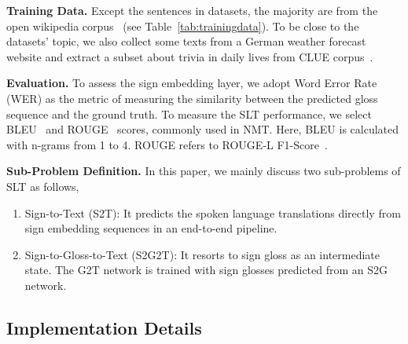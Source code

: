 \documentclass[final]{cvpr}
\begin{document}
\textbf{Training Data.} 
Except the sentences in datasets, 
the majority are from the open wikipedia corpus~\cite{WMT19findings} (see Table~\ref{tab:trainingdata}). 
To be close to the datasets' topic, we also collect some texts from a German weather forecast website and extract a subset about trivia in daily lives from CLUE corpus~\cite{xu-etal-2020-clue}. 

\textbf{Evaluation.}
To assess the sign embedding layer, we adopt Word Error Rate (WER) as the metric of measuring the similarity between the predicted gloss sequence and the ground truth. 
To measure the SLT performance, we select BLEU~\cite{papineni2002bleu} and ROUGE~\cite{lin-2004-rouge} scores, commonly used in NMT. Here, BLEU is calculated with n-grams from 1 to 4. ROUGE refers to ROUGE-L F1-Score~\cite{lin-2004-rouge}.

\textbf{Sub-Problem Definition.} 
In this paper, we mainly discuss two sub-problems of SLT as follows, 
\begin{enumerate}[itemsep=0pt,topsep=2pt,parsep=1pt]
   \item Sign-to-Text (S2T): It predicts the spoken language translations directly from sign embedding sequences in an end-to-end pipeline.  
   \item Sign-to-Gloss-to-Text (S2G2T): 
               It resorts to sign gloss as an intermediate state. 
               The G2T network is trained with sign glosses predicted from an S2G network. 
\end{enumerate}


\subsection{Implementation Details}

\begin{table}[tp] 
   \centering
   \footnotesize
   \caption{Temporal Inception Network Architecture~\cite{cui-tmm19} (TIN) for sign language embedding. 
            1D Batch Norm (BN) layer is added after each temporal convolution layer.} \label{tab:arch}
\end{table}
\end{document}
